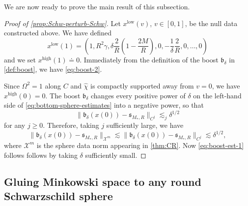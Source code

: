 \documentclass[10pt]{article}
\numberwithin{equation}{section}
\theoremstyle{plain}
\newtheorem*{thmA}{Theorem A}
\theoremstyle{definition}
\renewcommand{\Bbb}{\mathbb}
\newcommand{\ve}{\varepsilon}
\newcommand{\les}{\lesssim}
\begin{document}
We are now ready to prove the main result of this subsection.

\begin{proof}[Proof of \cref{prop:Schw-perturb-Schw}]
 Let $x^\mathrm{low}(v)$, $v\in [0,1]$, be the null data constructed above. We have defined
\begin{equation*}
    x^\mathrm{low}(1)=\left(1,R^2\gamma,\delta\frac{2}{R}\left(1-\frac{2M}{R}\right),0,-\frac{1}{\delta}\frac{2}{R},0,\dotsc,0\right)
\end{equation*} and we set $x^\mathrm{high}(1)\doteq 0$. 
Immediately from the definition of the boost $\mathfrak b_\delta$ in \cref{def:boost}, we have \eqref{eq:boost-2}. 

Since $\Omega^2=1$ along $C$ and $\hat\chi$ is compactly supported away from $v=0$, we have $x^\mathrm{high}(0)=0$. The boost $\mathfrak b_\delta$ changes every positive power of $\delta$ on the left-hand side of \eqref{eq:bottom-sphere-estimates} into a negative power, so that 
\begin{equation*}
    \|\mathfrak b_\delta(x(0))-\mathfrak s_{M_*,R}\|_{C^j}\les_j \delta^{1/2}
\end{equation*} 
for any $j\ge 0$. Therefore, taking $j$ sufficiently large, we have 
\begin{equation*}
   \|\mathfrak b_\delta(x(0))-\mathfrak s_{M_*,R}\|_{\mathcal X^m}\les \|\mathfrak b_\delta(x(0))-\mathfrak s_{M_*,R}\|_{C^j}\les \delta^{1/2},
\end{equation*}
where $\mathcal X^m$ is the sphere data norm appearing in \cref{thm:CR}. Now \eqref{eq:boost-est-1} follows follows by taking $\delta$ sufficiently small.
\end{proof}

\subsection{Gluing Minkowski space to any round Schwarzschild sphere}
\label{sec:thmA}

\end{document}
